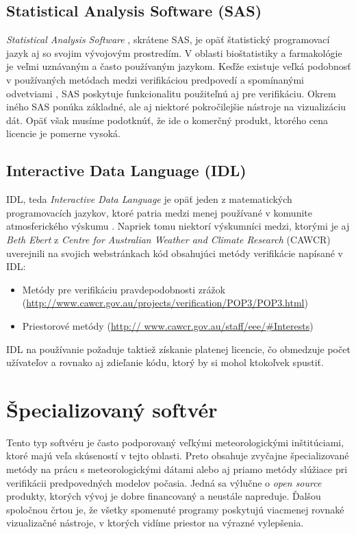 \subsection[SAS]{Statistical Analysis Software (SAS)}
\textit{Statistical Analysis Software} \cite{SAS}, skrátene SAS, je opäť štatistický programovací jazyk aj so svojim vývojovým prostredím. V oblasti bioštatistiky a farmakológie je veľmi uznávaným a často používaným jazykom. Keďže existuje veľká podobnosť v používaných metódach medzi verifikáciou predpovedí a spomínanými odvetviami \cite{VerifSoft}, SAS poskytuje funkcionalitu použiteľnú aj pre verifikáciu. Okrem iného SAS ponúka základné, ale aj niektoré pokročilejšie nástroje na vizualizáciu dát. Opäť však musíme podotknúť, že ide o komerčný produkt, ktorého cena licencie je pomerne vysoká.

\subsection[IDL]{Interactive Data Language (IDL)}
IDL, teda \textit{Interactive Data Language} \cite{IDL} je opäť jeden z matematických programovacích jazykov, ktoré patria medzi menej používané v komunite atmosferického výskumu \cite{VerifSoft}. Napriek tomu niektorí výskumníci medzi, ktorými je aj \textit{Beth Ebert} z \textit{Centre for Australian Weather and Climate Research} (CAWCR) uverejnili na svojich webstránkach kód obsahujúci metódy verifikácie napísané v IDL:
\begin{itemize}
	\item Metódy pre verifikáciu pravdepodobnosti zrážok 	(\url{http://www.cawcr.gov.au/projects/verification/POP3/POP3.html})
	\item Priestorové metódy (\url{http://
		www.cawcr.gov.au/staff/eee/#Interests})
\end{itemize} 
IDL na používanie požaduje taktiež získanie platenej licencie, čo obmedzuje počet užívateľov a rovnako aj zdieľanie kódu, ktorý by si mohol ktokoľvek spustiť.


\section{Špecializovaný softvér}

Tento typ softvéru je často podporovaný veľkými meteorologickými inštitúciami, ktoré majú veľa skúseností v tejto oblasti. Preto  obsahuje zvyčajne špecializované metódy na prácu s meteorologickými dátami alebo aj priamo metódy slúžiace pri verifikácii predpovedných modelov počasia. Jedná sa výlučne o \textit{open source} produkty, ktorých vývoj je dobre financovaný a neustále napreduje. Ďalšou spoločnou črtou je, že všetky spomenuté programy poskytujú viacmenej rovnaké vizualizačné nástroje, v ktorých vidíme priestor na výrazné vylepšenia.

